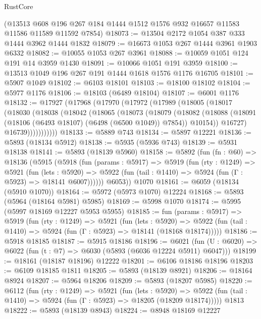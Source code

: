 \begin{lexlean}{RustCore}
\begin{coremodule}
    (@13513 @608 @196 @267 @184 @1444 @1512 @1576 @932 @16657 @11583 @11586 @11589 @11592 @7854)
@18073 := @13504 @2172 @1054 @387 @333 @1444 @3962 @1444 @1832
@18079 := @16673 @1053 @267 @1444 @3961 @1903 @6332
@18082 := @10055 @1053 @267 @3961
@18088 := @10059 @1051 @124 @191 @14 @3959 @1430
@18091 := @10066 @1051 @191 @3959
@18100 := @13513 @1049 @196 @267 @191 @1444 @1618 @1576 @1176 @16705
@18101 := @5907 @1049
@18102 := @6103 @18101
@18103 := @18100 @18102
@18104 := @5977 @1176
@18106 := @18103 (@6489 @18104)
@18107 := @6001 @1176
@18132 := @17927
    (@17968
      (@17970
        (@17972
          (@17989
            (@18005
              (@18017
                (@18030
                  (@18038
                    (@18042
                      (@18065
                        (@18073
                          (@18079
                            (@18082
                              (@18088
                                (@18091 (@18106 (@6493 @18107) (@6498 (@6500 @1049)) @7854))
                                @10154))
                            @16727)
                          @16739)))))))))))
@18133 := @5889 @743
@18134 := @5897 @12221
@18136 := @5893 (@18134 @5912)
@18138 := @5935 (@5936 @743)
@18139 := @5931 @18138
@18141 := @5893 (@18139 @5960)
@18158 := @5892
    (fun (fn : @60) =>
    @18136
      (@5915
        (@5918
          (fun (params : @5917) =>
          @5919
            (fun (rty : @1249) =>
            @5921
              (fun (lets : @5920) =>
              @5922 (fun (tail : @1410) => @5924 (fun (Γ : @5923) => @18141 @6007))))))
        @6053))
    @1070
@18161 := @6059 (@18134 (@5910 @1070))
@18164 := @5972 (@5973 @1070) @12224
@18168 := @5893 (@5964 (@18164 @5981) @5985)
@18169 := @5998 @1070
@18174 := @5995 (@5997 @18169 @12227 @5953 @5955)
@18185 := fun (params : @5917) =>
  @5919
    (fun (rty : @1249) =>
    @5921
      (fun (lets : @5920) =>
      @5922 (fun (tail : @1410) => @5924 (fun (Γ : @5923) => @18141 (@18168 @18174)))))
@18186 := @5918 @18185
@18187 := @5915 @18186
@18196 := @6021
    (fun (U : @6020) => @6022 (fun (t : @7) => @6030 (@5893 (@6036 @12224 @5911) @6047)))
@18199 := @18161 (@18187 @18196) @12222
@18201 := @6106 @18186 @18196
@18203 := @6109 @18185 @1811
@18205 := @5893 (@18139 @8921)
@18206 := @18164 @8924
@18207 := @5964 @18206
@18209 := @5893 (@18207 @5985)
@18220 := @6112
    (fun (rty : @1249) =>
    @5921
      (fun (lets : @5920) =>
      @5922 (fun (tail : @1410) => @5924 (fun (Γ : @5923) => @18205 (@18209 @18174)))))
    @1813
@18222 := @5893 (@18139 @8943)
@18224 := @8948 @18169 @12227

\end{coremodule}
\end{lexlean}
